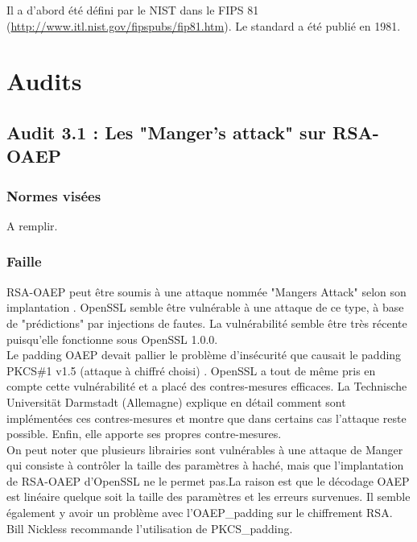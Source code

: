 Il a d'abord été défini par le NIST dans le FIPS 81 (\url{http://www.itl.nist.gov/fipspubs/fip81.htm}). Le standard a été publié en 1981.


\section{Audits}
	\subsection{Audit 3.1 : Les "Manger's attack" sur RSA-OAEP}
		\subsubsection{Normes visées}

		A remplir.
	
		\subsubsection{Faille}
		
			RSA-OAEP peut être soumis à une attaque nommée "Mangers Attack" selon son implantation \cite{mangers2010falko}. OpenSSL semble être vulnérable à une attaque de ce type, à base de "prédictions" par injections de fautes. La vulnérabilité semble être très récente puisqu'elle fonctionne sous OpenSSL 1.0.0.\\

			
			Le padding OAEP devait pallier le problème d'insécurité que causait le padding PKCS\#1 v1.5 (attaque à chiffré choisi) \cite{bleichenbacherPCKS}. OpenSSL a tout de même pris en compte cette vulnérabilité et a placé des contres-mesures efficaces.	La Technische Universität Darmstadt (Allemagne) explique en détail comment sont implémentées ces contres-mesures et montre que dans certains cas l'attaque reste possible. Enfin, elle apporte ses propres contre-mesures.\\
			
			On peut noter que plusieurs librairies sont vulnérables à une attaque de Manger qui consiste à contrôler la taille des paramètres à haché, mais que l'implantation de RSA-OAEP d'OpenSSL ne le permet pas.La raison est que le décodage OAEP est linéaire quelque soit la taille des paramètres et les erreurs survenues. 	Il semble également y avoir un problème avec l'OAEP\_padding sur le chiffrement RSA. Bill Nickless recommande l'utilisation de PKCS\_padding. \cite{sourceforgeRSAbroken}	\\
		
